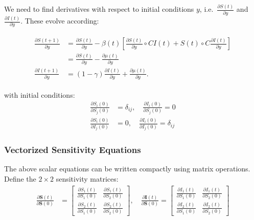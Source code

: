 We need to find derivatives with respect to initial conditions $y$, i.e.~$\frac{\partial S(t)}{\partial y}$ and $\frac{\partial I(t)}{\partial y}$. These evolve according:

\begin{align}\begin{split}
  \frac{\partial S(t+1)}{\partial y} &= \frac{\partial S(t)}{\partial y} - \beta(t) \left[ \frac{\partial S(t)}{\partial y} \circ  CI(t) + S(t)\circ C \frac{\partial I(t)}{\partial y} \right] \\
  & = \frac{\partial S(t)}{\partial y} - \frac{\partial \mu(t)}{\partial y} \\
  \frac{\partial I(t+1)}{\partial y} &= (1-\gamma) \frac{\partial I(t)}{\partial y} + \frac{\partial \mu(t)}{\partial y}.
\end{split}\end{align}


with initial conditions:
\begin{align}
\frac{\partial S_i(0)}{\partial S_j(0)} &= \delta_{ij}, \quad \frac{\partial I_i(0)}{\partial S_j(0)} = 0 \\
\frac{\partial S_i(0)}{\partial I_j(0)} &= 0, \quad \frac{\partial I_i(0)}{\partial I_j(0)} = \delta_{ij}
\end{align}

\subsubsection{Vectorized Sensitivity Equations}

The above scalar equations can be written compactly using matrix operations. Define the $2 \times 2$ sensitivity matrices:
\begin{align}
\frac{\partial \mathbf{S}(t)}{\partial \mathbf{S}(0)} &= \begin{bmatrix} \frac{\partial S_1(t)}{\partial S_1(0)} & \frac{\partial S_1(t)}{\partial S_2(0)} \\ \frac{\partial S_2(t)}{\partial S_1(0)} & \frac{\partial S_2(t)}{\partial S_2(0)} \end{bmatrix}, \quad \frac{\partial \mathbf{I}(t)}{\partial \mathbf{S}(0)} = \begin{bmatrix} \frac{\partial I_1(t)}{\partial S_1(0)} & \frac{\partial I_1(t)}{\partial S_2(0)} \\ \frac{\partial I_2(t)}{\partial S_1(0)} & \frac{\partial I_2(t)}{\partial S_2(0)} \end{bmatrix}
\end{align}

